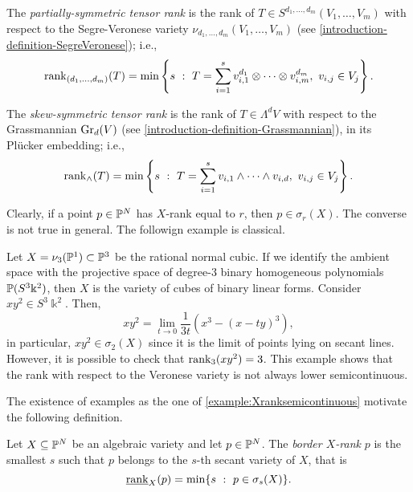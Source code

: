 \begin{definition}
\label{classicalAG-definition-partially_symmetric_tensor_rank}
    The \emph{partially-symmetric tensor rank} is the rank of $T \in S^{d_1,\ldots,d_m}(V_1,\ldots,V_m)$ with respect to the Segre-Veronese variety $\nu_{d_1,\ldots,d_m}(V_1,\ldots,V_m)$ (see \ref{introduction-definition-SegreVeronese}); i.e., 
    \[
        \mathrm{rank}_{(d_1,\ldots,d_m)}(T) = \min\left\{s ~:~ T = \sum_{i=1}^s v_{i,1}^{d_1}\otimes \cdots \otimes v_{i,m}^{d_m}, ~ v_{i,j} \in V_j\right\}.
    \]
\end{definition}

\begin{definition}
\label{classicalAG-definition-skewsymmetric_tensor_rank}
    The \emph{skew-symmetric tensor rank} is the rank of $T \in \Lambda^dV$ with respect to the Grassmannian $\mathrm{Gr}_d(V)$ (see \ref{introduction-definition-Grassmannian}), in its Pl\"ucker embedding; i.e., 
    \[
        \mathrm{rank}_{\wedge}(T) = \min\left\{s ~:~ T = \sum_{i=1}^s v_{i,1}\wedge \dots \wedge v_{i,d}, ~ v_{i,j} \in V_j\right\}.
    \]
\end{definition}

Clearly, if a point $p \in \mathbb{P}^N$ has $X$-rank equal to $r$, then $p \in \sigma_r(X)$. The converse is not true in general. The followign example is classical.

\begin{example}
\label{classicalAG-example-Xranksemicontinuous}
  Let $X = \nu_3(\mathbb{P}^1) \subset \mathbb{P}^3$ be the rational normal cubic. If we identify the ambient space with the projective space of degree-$3$ binary homogeneous polynomials $\mathbb{P}(S^3\Bbbk^2)$, then $X$ is the variety of cubes of binary linear forms. Consider $xy^2 \in S^3\Bbbk^2$. Then, 
  \[
     xy^2 = \lim_{t \to 0} \frac{1}{3t}\left( x^3 - (x-ty)^3\right),
\]
 in particular, $xy^2 \in \sigma_2(X)$ since it is the limit of points lying on secant lines. However, it is possible to check that $\mathrm{rank}_3(xy^2) = 3$. This example shows that the rank with respect to the Veronese variety is not always lower semicontinuous. 
\end{example}

The existence of examples as the one of \ref{example:Xranksemicontinuous} motivate the following definition.
\begin{definition}
    \label{classicalAG-definition-border_rank}
    Let $X \subseteq \mathbb{P}^N$ be an algebraic variety and let $p \in \mathbb{P}^N$. The \emph{border $X$-rank} $p$ is the smallest $s$ such that $p$ belongs to the $s$-th secant variety of $X$, that is 
    \[
        \underline{\mathrm{rank}}_X(p) = \min\{s ~:~ p \in \sigma_s(X)\}.
    \]
\end{definition}

